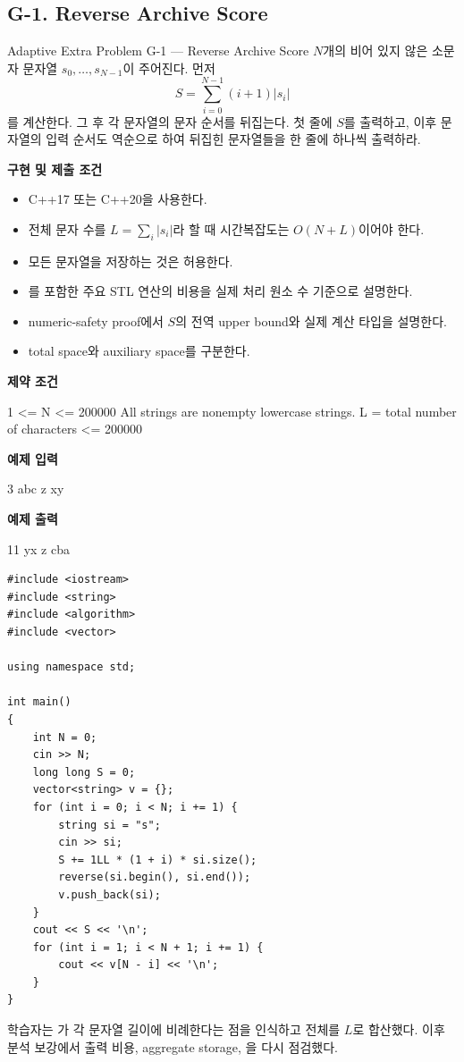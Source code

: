 \subsection{G-1. Reverse Archive Score}
\begin{problembox}{Adaptive Extra Problem G-1 --- Reverse Archive Score}
$N$개의 비어 있지 않은 소문자 문자열 $s_0,\dots,s_{N-1}$이 주어진다. 먼저
\[
S=\sum_{i=0}^{N-1}(i+1)|s_i|
\]
를 계산한다. 그 후 각 문자열의 문자 순서를 뒤집는다. 첫 줄에 $S$를 출력하고, 이후 문자열의 입력 순서도 역순으로 하여 뒤집힌 문자열들을 한 줄에 하나씩 출력하라.

\textbf{구현 및 제출 조건}
\begin{itemize}
  \item C++17 또는 C++20을 사용한다.
  \item 전체 문자 수를 $L=\sum_i|s_i|$라 할 때 시간복잡도는 $O(N+L)$이어야 한다.
  \item 모든 문자열을 저장하는 것은 허용한다.
  \item {}를 포함한 주요 STL 연산의 비용을 실제 처리 원소 수 기준으로 설명한다.
  \item numeric-safety proof에서 $S$의 전역 upper bound와 실제 계산 타입을 설명한다.
  \item total space와 auxiliary space를 구분한다.
\end{itemize}

\textbf{제약 조건}
\begin{TextBlock}
1 <= N <= 200000
All strings are nonempty lowercase strings.
L = total number of characters <= 200000
\end{TextBlock}

\textbf{예제 입력}
\begin{TextBlock}
3
abc
z
xy
\end{TextBlock}

\textbf{예제 출력}
\begin{TextBlock}
11
yx
z
cba
\end{TextBlock}
\end{problembox}

\begin{answerbox}[학습자 제출 답안]
\begin{lstlisting}
#include <iostream>
#include <string>
#include <algorithm>
#include <vector>

using namespace std;

int main()
{
    int N = 0;
    cin >> N;
    long long S = 0;
    vector<string> v = {};
    for (int i = 0; i < N; i += 1) {
        string si = "s";
        cin >> si;
        S += 1LL * (1 + i) * si.size();
        reverse(si.begin(), si.end());
        v.push_back(si);
    }
    cout << S << '\n';
    for (int i = 1; i < N + 1; i += 1) {
        cout << v[N - i] << '\n';
    }
}
\end{lstlisting}

학습자는 가 각 문자열 길이에 비례한다는 점을 인식하고 전체를 $L$로 합산했다. 이후 분석 보강에서 출력 비용, aggregate storage, 을 다시 점검했다.
\end{answerbox}

